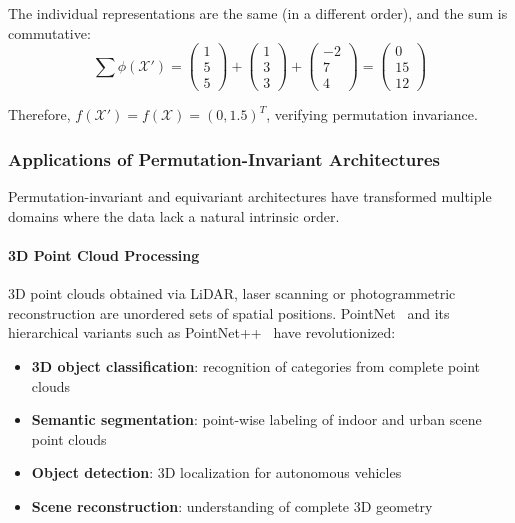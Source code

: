 \begin{example}
The individual representations are the same (in a different order), and the sum is commutative:
\begin{equation}
\sum \phi(\mathcal{X}') = \begin{pmatrix} 1 \\ 5 \\ 5 \end{pmatrix} + \begin{pmatrix} 1 \\ 3 \\ 3 \end{pmatrix} + \begin{pmatrix} -2 \\ 7 \\ 4 \end{pmatrix} = \begin{pmatrix} 0 \\ 15 \\ 12 \end{pmatrix}
\end{equation}

Therefore, $f(\mathcal{X}') = f(\mathcal{X}) = (0, 1.5)^T$, verifying permutation invariance.
\end{example}

\subsubsection{Applications of Permutation-Invariant Architectures}

Permutation-invariant and equivariant architectures have transformed multiple domains where the data lack a natural intrinsic order.

\paragraph{3D Point Cloud Processing}

3D point clouds obtained via LiDAR, laser scanning or photogrammetric reconstruction are unordered sets of spatial positions. PointNet~\citep{qi2017pointnet} and its hierarchical variants such as PointNet++~\citep{qi2017pointnetplus} have revolutionized:

\begin{itemize}
    \item \textbf{3D object classification}: recognition of categories from complete point clouds
    \item \textbf{Semantic segmentation}: point-wise labeling of indoor and urban scene point clouds
    \item \textbf{Object detection}: 3D localization for autonomous vehicles
    \item \textbf{Scene reconstruction}: understanding of complete 3D geometry
\end{itemize}


